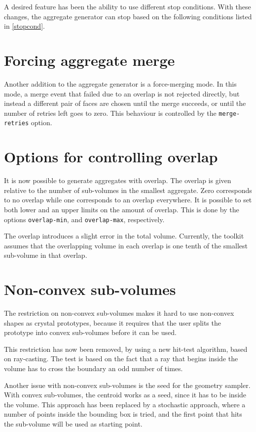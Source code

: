 \documentclass[a4paper,10pt]{scrartcl}
\begin{document}
A desired feature has been the ability to use different stop conditions. With these changes, the aggregate generator can stop based on the following conditions listed in \cref{stopcond}.

\section{Forcing aggregate merge}
Another addition to the aggregate generator is a force-merging mode. In this mode, a merge event that failed due to an overlap is not rejected directly, but instead a different pair of faces are chosen until the merge succeeds, or until the number of retries left goes to zero. This behaviour is controlled by the \texttt{merge-retries} option.

\section{Options for controlling overlap}
It is now possible to generate aggregates with overlap. The overlap is given relative to the number of sub-volumes in the smallest aggregate. Zero corresponds to no overlap while one corresponds to an overlap everywhere. It is possible to set both lower and an upper limits on the amount of overlap. This is done by the options \texttt{overlap-min}, and \texttt{overlap-max}, respectively.

The overlap introduces a slight error in the total volume. Currently, the toolkit assumes that the overlapping volume in each overlap is one tenth of the smallest sub-volume in that overlap.

\section{Non-convex sub-volumes}
The restriction on non-convex sub-volumes makes it hard to use non-convex shapes as crystal prototypes, because it requires that the user splits the prototype into convex sub-volumes before it can be used.

This restriction has now been removed, by using a new hit-test algorithm, based on ray-casting. The test is based on the fact that a ray that begins inside the volume has to cross the boundary an odd number of times.

Another issue with non-convex sub-volumes is the seed for the geometry sampler. With convex sub-volumes, the centroid works as a seed, since it has to be inside the volume. This approach has been replaced by a stochastic approach, where a number of points inside the bounding box is tried, and the first point that hits the sub-volume will be used as starting point.
\end{document}
